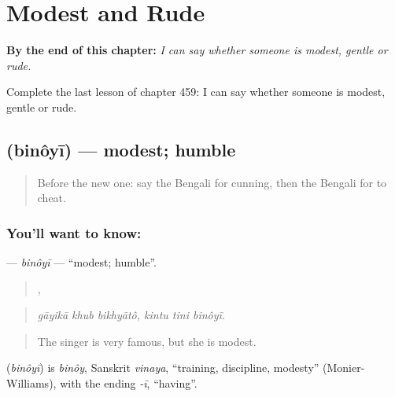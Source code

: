 
\chapter{Modest and Rude}
\label{ch:bn-modest-and-rude}

\begin{chapteropening}
\textbf{By the end of this chapter:} \emph{I can say whether someone is modest, gentle or rude.}

Complete the last lesson of chapter 459: I can say whether someone is modest, gentle or rude.
\end{chapteropening}

\section[\texorpdfstring{\bn{বিনয়ী} (binôyī)}{বিনয়ী (binôyī)}]{ (binôyī) — modest; humble}

\label{lesson:BN-C459-binoyi}



\begin{quote}
Before the new one: say the Bengali for cunning, then the Bengali for to cheat.
\end{quote}

\subsection*{You'll want to know: }
\textbf{} — \emph{binôyī} — \textquotedblleft{}modest; humble\textquotedblright{}.

\begin{quote}
  ,   
\end{quote}

\begin{quote}
\emph{gāyikā khub bikhyātô, kintu tini binôyī.}
\end{quote}

\begin{quote}
The singer is very famous, but she is modest.
\end{quote}

\begin{cousinweb}
\textbf{} (\emph{binôyī}) is \emph{binôy}, Sanskrit \emph{vinaya}, \textquotedblleft{}training, discipline, modesty\textquotedblright{} (Monier-Williams), with the ending \emph{-ī}, \textquotedblleft{}having\textquotedblright{}.
\end{cousinweb}

